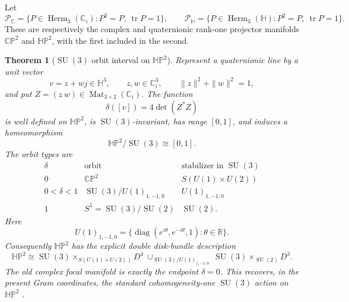 \documentclass[11pt]{article}
\newtheorem{theorem}{Theorem}[section]
\theoremstyle{definition}
\theoremstyle{remark}
\newcommand{\R}{\mathbb R}
\newcommand{\C}{\mathbb C}
\newcommand{\Hh}{\mathbb H}
\newcommand{\CP}{\mathbb{CP}}
\newcommand{\HP}{\mathbb{HP}}
\newcommand{\Herm}{\operatorname{Herm}}
\newcommand{\Mat}{\operatorname{Mat}}
\newcommand{\tr}{\operatorname{tr}}
\newcommand{\diag}{\operatorname{diag}}
\newcommand{\SU}{\operatorname{SU}}
\begin{document}
Let
\[
 \mathcal P_{\C}
 =\{P\in\Herm_3(\C_i):P^2=P,\ \tr P=1\},
 \qquad
 \mathcal P_{\Hh}
 =\{P\in\Herm_3(\Hh):P^2=P,\ \tr P=1\}.
\]
These are respectively the complex and quaternionic rank-one projector
manifolds $\CP^2$ and $\HP^2$, with the first included in the second.

\begin{theorem}[\texorpdfstring{$\SU(3)$}{SU(3)} orbit interval on \texorpdfstring{$\HP^2$}{HP2}]\label{thm:HP2-orbits}
Represent a quaternionic line by a unit vector
\[
 v=z+w j\in\Hh^3,
 \qquad z,w\in\C_i^3,
 \qquad \|z\|^2+\|w\|^2=1,
\]
and put $Z=(z\ w)\in\Mat_{3\times2}(\C_i)$.  The function
\begin{equation}\label{eq:delta-HP2}
 \delta([v])=4\det(Z^*Z)
\end{equation}
is well defined on $\HP^2$, is $\SU(3)$-invariant, has range
$[0,1]$, and induces a homeomorphism
\begin{equation}\label{eq:HP2-quotient}
 \boxed{\HP^2/\SU(3)\cong[0,1].}
\end{equation}
The orbit types are
\begin{equation}\label{eq:HP2-orbit-types}
\begin{array}{c|c|c}
\delta&\text{orbit}&\text{stabilizer in }\SU(3)\\ \hline
0&\CP^2& S(U(1)\times U(2))\\
0<\delta<1&\SU(3)/U(1)_{1,-1,0}&
 U(1)_{1,-1,0}\\
1&S^5=\SU(3)/\SU(2)&\SU(2).
\end{array}
\end{equation}
Here
\[
 U(1)_{1,-1,0}
 =\{\diag(e^{i\theta},e^{-i\theta},1):\theta\in\R\}.
\]
Consequently $\HP^2$ has the explicit double disk-bundle description
\begin{equation}\label{eq:HP2-double-disk}
 \boxed{
 \HP^2
 \cong
 \SU(3)\times_{S(U(1)\times U(2))}D^4
 \ \cup_{\SU(3)/U(1)_{1,-1,0}}\ 
 \SU(3)\times_{\SU(2)}D^3.}
\end{equation}
The old complex focal manifold is exactly the endpoint $\delta=0$.  This
recovers, in the present Gram coordinates, the standard cohomogeneity-one
$\SU(3)$ action on $\HP^2$ \cite{Gambioli}.
\end{theorem}
\end{document}
